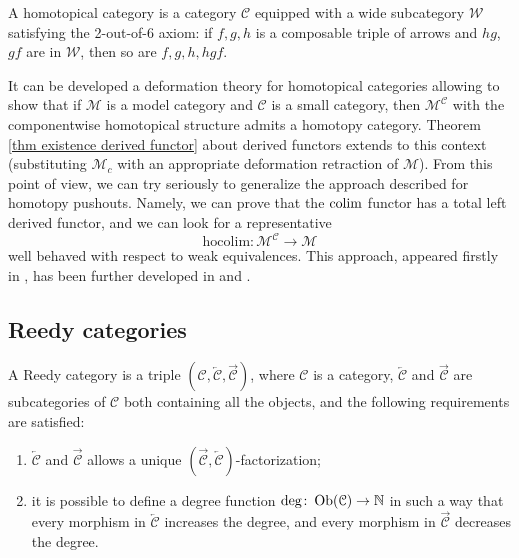 \begin{refsection}
\begin{defin}
A homotopical category is a category $\mathcal C$ equipped with a wide subcategory $\mathcal W$ satisfying the 2-out-of-6 axiom: if $f,g,h$ is a composable triple of arrows and $hg$, $gf$ are in $\mathcal W$, then so are $f,g,h,hgf$.
\end{defin}

It can be developed a deformation theory for homotopical categories allowing to show that if $\mathcal M$ is a model category and $\mathcal C$ is a small category, then $\mathcal M^{\mathcal C}$ with the componentwise homotopical structure admits a homotopy category. Theorem \ref{thm existence derived functor} about derived functors extends to this context (substituting $\mathcal M_c$ with an appropriate deformation retraction of $\mathcal M$). From this point of view, we can try seriously to generalize the approach described for homotopy pushouts. Namely, we can prove that the $\operatorname*{colim}$ functor has a total left derived functor, and we can look for a representative
\[
\mathrm{hocolim} \colon \mathcal M^{\mathcal C} \to \mathcal M
\]
well behaved with respect to weak equivalences. This approach, appeared firstly in \cite{dwyer-hirschhorn-kan-smith-homotopy-limit-functors}, has been further developed in \cite{shulman} and \cite{riehl}.

\subsection{Reedy categories}

\begin{defin}
A Reedy category is a triple $\left(\mathcal C, \overleftarrow{\mathcal C}, \overrightarrow{\mathcal C}\right)$, where $\mathcal C$ is a category, $\overleftarrow{\mathcal C}$ and $\overrightarrow{\mathcal C}$ are subcategories of $\mathcal C$ both containing all the objects, and the following requirements are satisfied:
\begin{enumerate}
\item $\overleftarrow{\mathcal C}$ and $\overrightarrow{\mathcal C}$ allows a unique $\left(\overrightarrow{\mathcal C}, \overleftarrow{\mathcal C}\right)$-factorization;
\item it is possible to define a degree function $\deg \colon \operatorname{Ob}(\mathcal C) \to \mathbb{N}$ in such a way that every morphism in $\overleftarrow{\mathcal C}$ increases the degree, and every morphism in $\overrightarrow{\mathcal C}$ decreases the degree.
\end{enumerate}
\end{defin}


\end{refsection}

